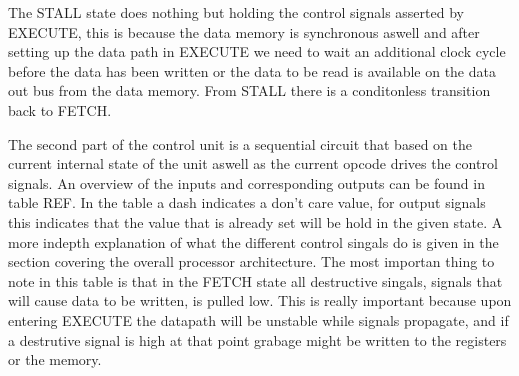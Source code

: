 The STALL state does nothing but holding the control signals asserted by EXECUTE, this is because the data memory is synchronous aswell and after setting up the data path in EXECUTE we need to wait an additional clock cycle before the data has been written or the data to be read is available on the data out bus from the data memory. From STALL there is a conditonless transition back to FETCH.

The second part of the control unit is a sequential circuit that based on the current internal state of the unit aswell as the current opcode drives the control signals. An overview of the inputs and corresponding outputs can be found in table REF. In the table a dash indicates a don't care value, for output signals this indicates that the value that is already set will be hold in the given state. A more indepth explanation of what the different control singals do is given in the section covering the overall processor architecture. The most importan thing to note in this table is that in the FETCH state all destructive singals, signals that will cause data to be written, is pulled low. This is really important because upon entering EXECUTE the datapath will be unstable while signals propagate, and if a destrutive signal is high at that point grabage might be written to the registers or the memory. 


